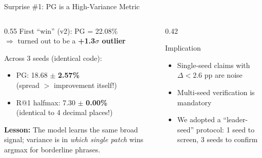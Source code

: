 \documentclass[aspectratio=169,12pt]{beamer}
\begin{document}
\begin{frame}{Surprise \#1: PG is a High-Variance Metric}
  \begin{columns}[T]
    \begin{column}{0.55\textwidth}
      First ``win'' (v2): PG = 22.08\%\\
      $\Rightarrow$ turned out to be a \textbf{+1.3$\sigma$ outlier}

      \vspace{0.5em}
      Across 3 seeds (identical code):
      \begin{itemize}
        \item PG: 18.68 $\pm$ \textbf{2.57\%}\\
              (spread $>$ improvement itself!)
        \item R@1 halfmax: 7.30 $\pm$ \textbf{0.00\%}\\
              (identical to 4 decimal places!)
      \end{itemize}

      \vspace{0.5em}
      \textbf{Lesson:} The model learns the same broad signal; variance is in \emph{which single patch} wins argmax for borderline phrases.
    \end{column}
    \begin{column}{0.42\textwidth}
      \begin{block}{Implication}
        \begin{itemize}
          \item Single-seed claims with $\Delta < 2.6$ pp are noise
          \item Multi-seed verification is mandatory
          \item We adopted a ``leader-seed'' protocol: 1 seed to screen, 3 seeds to confirm
        \end{itemize}
      \end{block}
    \end{column}
  \end{columns}
\end{frame}
\end{document}
